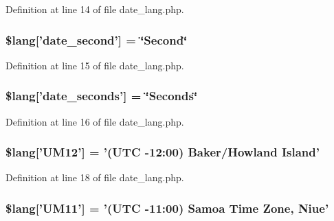 Definition at line 14 of file date\-\_\-lang.\-php.

\hypertarget{date__lang_8php_ac1b67b9034a78d631bf5302df6105136}{
\subsubsection[{\$lang}]{\setlength{\rightskip}{0pt plus 5cm}\$lang\mbox{[}'date\-\_\-second'\mbox{]} = \char`\"{}Second\char`\"{}}}\label{date__lang_8php_ac1b67b9034a78d631bf5302df6105136}


Definition at line 15 of file date\-\_\-lang.\-php.

\hypertarget{date__lang_8php_a0a75c76e6e4be09a6c5f1a1727fa2c78}{
\subsubsection[{\$lang}]{\setlength{\rightskip}{0pt plus 5cm}\$lang\mbox{[}'date\-\_\-seconds'\mbox{]} = \char`\"{}Seconds\char`\"{}}}\label{date__lang_8php_a0a75c76e6e4be09a6c5f1a1727fa2c78}


Definition at line 16 of file date\-\_\-lang.\-php.

\hypertarget{date__lang_8php_aa03db528f49f0bdd57489a7e057a95dc}{
\subsubsection[{\$lang}]{\setlength{\rightskip}{0pt plus 5cm}\$lang\mbox{[}'U\-M12'\mbox{]} = '(U\-T\-C -\/12\-:00) Baker/Howland Island'}}\label{date__lang_8php_aa03db528f49f0bdd57489a7e057a95dc}


Definition at line 18 of file date\-\_\-lang.\-php.

\hypertarget{date__lang_8php_a2257b69398113162bdafb48f1bab4973}{
\subsubsection[{\$lang}]{\setlength{\rightskip}{0pt plus 5cm}\$lang\mbox{[}'U\-M11'\mbox{]} = '(U\-T\-C -\/11\-:00) Samoa Time Zone, Niue'}}\label{date__lang_8php_a2257b69398113162bdafb48f1bab4973}


